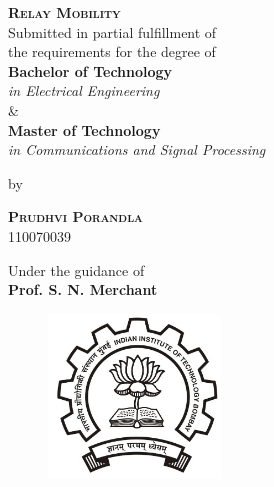\begin{titlepage}
    \begin{center}
	\textbf{%
	\vspace{0.05in}
	\Large{\textsc{Relay Mobility}}\\ \vspace{0.1in}
	}
	\vspace{0.5in}
	\large Submitted in partial fulfillment of\\
	the requirements for the degree of\\
	\vspace{0.3in}
	\textbf{Bachelor of Technology} \\ \emph{in Electrical Engineering} \\ \& \\ \textbf{Master of Technology} \\ \emph{in Communications and Signal Processing}\\ \vspace{0.05in}

	\vspace{0.30in}
	\large{by}\\
	\vspace{0.30in}

	\large{\textsc{\textbf{Prudhvi Porandla}}}\\110070039

	\vspace{0.6in}
        \normalsize{Under the guidance of}\\ \vspace{0.1in}
	\textbf{\large{	Prof. S. N. Merchant
}}\\
	\vspace{0.2in}

	\begin{figure}[h]
	\begin{center}
	\includegraphics[width=1.8in]{images/logo.jpg}
	\end{center}
	\end{figure}


\end{center}
\end{titlepage}
